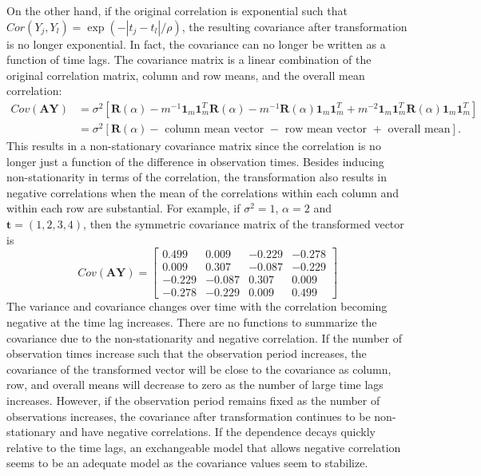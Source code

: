 \documentclass[12pt]{article}
\newcommand{\B}[0]{\mathbf}
\begin{document}
 On the other hand, if the original correlation is exponential such that $Cor(Y_{j},Y_{l}) = \exp(-|t_{j}-t_{l}|/\rho)$, the resulting covariance after transformation is no longer exponential. In fact, the covariance can no longer be written as a function of time lags. The covariance matrix is a linear combination of the original correlation matrix, column and row means, and the overall mean correlation:
   \begin{align*}
 Cov(\B A\B Y) &= \sigma^{2}\left[\B R(\alpha)-m^{-1}\B1_{m}\B1_{m}^{T}\B R(\alpha)-m^{-1}\B R(\alpha)\B1_{m}\B1_{m}^{T} + m^{-2}\B1_{m}\B1_{m}^{T}\B R(\alpha)\B1_{m}\B1_{m}^{T}\right]\\
  &= \sigma^{2}\left[\B R(\alpha)-\text{ column mean vector }-\text{ row mean vector } + \text{ overall mean}\right].
 \end{align*} 
 This results in a non-stationary covariance matrix since the correlation is no longer just a function of the difference in observation times. Besides inducing non-stationarity in terms of the correlation, the transformation also results in negative correlations when the mean of the correlations within each column and within each row are substantial. For example, if $\sigma^{2}=1$, $\alpha = 2$ and $\B t=(1,2,3,4)$, then the symmetric covariance matrix of the transformed vector is
$$ Cov(\B A\B Y) = \left[ \begin{array}{cccc}
 0.499&  0.009& -0.229& -0.278\\
  0.009&  0.307& -0.087& -0.229\\
 -0.229& -0.087&  0.307&  0.009\\
 -0.278& -0.229&  0.009&  0.499
\end{array}\right]$$
The variance and covariance changes over time with the correlation becoming negative at the time lag increases. There are no functions to summarize the covariance due to the non-stationarity and negative correlation. If the number of observation times increase such that the observation period increases, the covariance of the transformed vector will be close to the covariance as column, row, and overall means will decrease to zero as the number of large time lags increases. However, if the observation period remains fixed as the number of observations increases, the covariance after transformation continues to be non-stationary and have negative correlations.  If the dependence decays quickly relative to the time lags, an exchangeable model that allows negative correlation seems to be an adequate model as the covariance values seem to stabilize. \\ 
\end{document}
